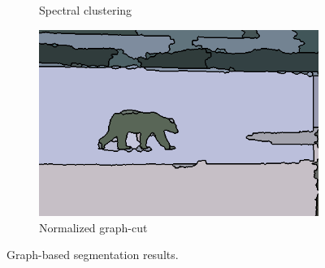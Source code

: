 \documentclass[journal]{IEEEtran}
\begin{document}
\begin{figure}[!ht]
\begin{subfigure}[b]{0.2\textwidth}
        \caption{Spectral clustering}
    \end{subfigure}\hfill 
    \begin{subfigure}[b]{0.2\textwidth}
    	\centering
        \includegraphics[width=\textwidth]{100007_ncut_result}
        \caption{Normalized graph-cut}
    \end{subfigure} 
        	    
    \caption{Graph-based segmentation results.}\label{fig:graph_based_segmentations}    
\end{figure}
\end{document}
